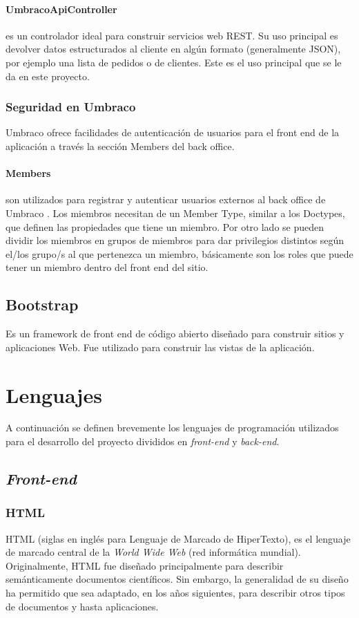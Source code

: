     \paragraph{UmbracoApiController} es un controlador ideal para construir servicios web REST. \cite{apiController} Su uso principal es devolver datos estructurados al cliente en algún formato (generalmente JSON), por ejemplo una lista de pedidos o de clientes. Este es el uso principal que se le da en este proyecto.

    \subsubsection{Seguridad en Umbraco}
    Umbraco ofrece facilidades de autenticación de usuarios para el front end de la aplicación a través la sección Members del back office.
    \paragraph{Members} son utilizados para registrar y autenticar usuarios externos al back office de Umbraco \cite{membersUmbraco}. Los miembros necesitan de un Member Type, similar a los Doctypes, que definen las propiedades que tiene un miembro. Por otro lado se pueden dividir los miembros en grupos de miembros para dar privilegios distintos según el/los grupo/s al que pertenezca un miembro, básicamente son los roles que puede tener un miembro dentro del front end del sitio.

    \subsection{Bootstrap}
    Es un framework de front end de código abierto diseñado para construir sitios y aplicaciones Web. Fue utilizado para construir las vistas de la aplicación.

\section{Lenguajes}
A continuación se definen brevemente los lenguajes de programación utilizados para el desarrollo del proyecto divididos en \textit{front-end} y \textit{back-end}.

\subsection{\emph{Front-end}}
\subsubsection{HTML}
HTML (siglas en inglés para Lenguaje de Marcado de HiperTexto), es el lenguaje de marcado central de la \textit{World Wide Web} (red informática mundial). Originalmente, HTML fue diseñado principalmente para describir semánticamente documentos científicos. Sin embargo, la generalidad de su diseño ha permitido que sea adaptado, en los años siguientes, para describir otros tipos de documentos y hasta aplicaciones. \cite{htmlW3C}

